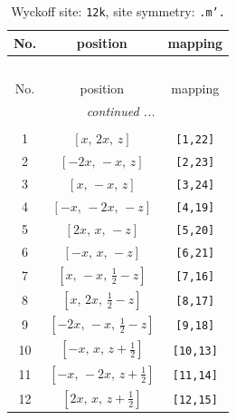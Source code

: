 \documentclass[fleqn,8pt]{jsarticle}
\begin{document}
\begin{longtable}{ccc}
\caption{Wyckoff site: {\tt 12k}, site symmetry: {\tt .m'.}}
 \\
 \hline \hline
No. & position & mapping \\ \hline \endfirsthead

\multicolumn{2}{l}{\tablename\ \thetable{}} \\
 \hline \hline
No. & position & mapping \\ \hline \endhead

 \hline \hline
\multicolumn{2}{r}{\footnotesize\it continued ...} \\ \endfoot

 \hline \hline
\multicolumn{2}{r}{} \\ \endlastfoot

1 & $\left[ x,\, 2 x,\, z \right]$ & {\tt [1,22]} \\ \hline
2 & $\left[ - 2 x,\, - x,\, z \right]$ & {\tt [2,23]} \\ \hline
3 & $\left[ x,\, - x,\, z \right]$ & {\tt [3,24]} \\ \hline
4 & $\left[ - x,\, - 2 x,\, - z \right]$ & {\tt [4,19]} \\ \hline
5 & $\left[ 2 x,\, x,\, - z \right]$ & {\tt [5,20]} \\ \hline
6 & $\left[ - x,\, x,\, - z \right]$ & {\tt [6,21]} \\ \hline
7 & $\left[ x,\, - x,\, \frac{1}{2} - z \right]$ & {\tt [7,16]} \\ \hline
8 & $\left[ x,\, 2 x,\, \frac{1}{2} - z \right]$ & {\tt [8,17]} \\ \hline
9 & $\left[ - 2 x,\, - x,\, \frac{1}{2} - z \right]$ & {\tt [9,18]} \\ \hline
10 & $\left[ - x,\, x,\, z + \frac{1}{2} \right]$ & {\tt [10,13]} \\ \hline
11 & $\left[ - x,\, - 2 x,\, z + \frac{1}{2} \right]$ & {\tt [11,14]} \\ \hline
12 & $\left[ 2 x,\, x,\, z + \frac{1}{2} \right]$ & {\tt [12,15]} \\
\end{longtable}
\renewcommand{\arraystretch}{1.2}
\end{document}
